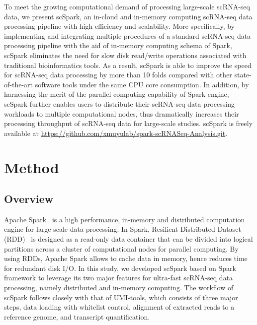 \documentclass[conference]{IEEEtran}
\begin{document}
To meet the growing computational demand of processing large-scale scRNA-seq data, we present scSpark, an in-cloud and in-memory computing scRNA-seq data processing pipeline with high efficiency and scalability. 
More specifically, by implementing and integrating multiple procedures of a standard scRNA-seq data processing pipeline with the aid of in-memory computing schema of Spark, scSpark eliminates the need for slow disk read/write operations associated with traditional bioinformatics tools. 
As a result, scSpark is able to improve the speed for scRNA-seq data processing by more than 10 folds compared with other state-of-the-art software tools under the same CPU core consumption. In addition, by harnessing the merit of the parallel computing capability of Spark engine, scSpark further enables users to distribute their scRNA-seq data processing workloads to multiple computational nodes, thus dramatically increases their processing throughput of scRNA-seq data for large-scale studies. 
scSpark is freely available at \url{https://github.com/xmuyulab/spark-scRNASeq-Analysis.git}.

\section{Method}
\subsection{Overview}
Apache Spark~\cite{zaharia2010spark} is a high performance, in-memory and distributed computation engine for large-scale data processing. 
In Spark, Resilient Distributed Dataset (RDD)~\cite{Zaharia2012Resilient} is designed as a read-only data container that can be divided into logical partitions across a cluster of computational nodes for parallel computing. 
By using RDDs, Apache Spark allows to cache data in memory, hence reduces time for redundant disk I/O.
In this study, we developed scSpark based on Spark framework to leverage its two major features for ultra-fast scRNA-seq data processing, namely distributed and in-memory computing. 
The workflow of scSpark follows closely with that of UMI-tools, which consists of three major steps, data loading with whitelist control, alignment of extracted reads to a reference genome, and transcript quantification. 
\end{document}
